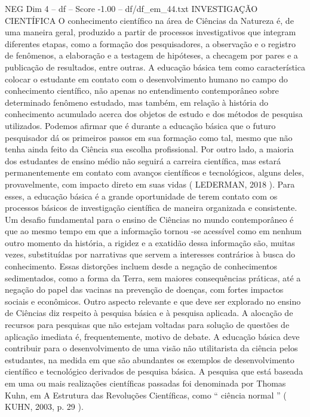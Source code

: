\begin{textsample}{NEG Dim 4 – df – Score -1.00 – df/df\_em\_44.txt}  \label{ex:f4_neg_070}
INVESTIGAÇÃO CIENTÍFICA O conhecimento científico na área de Ciências da Natureza é, de uma maneira geral, produzido a partir de processos investigativos que integram diferentes etapas, como a formação dos pesquisadores, a observação e o registro de fenômenos, a elaboração e a testagem de hipóteses, a checagem por pares e a publicação de resultados, entre outras.
A educação básica tem como característica colocar o estudante em contato com o desenvolvimento humano no campo do conhecimento científico, não apenas no entendimento contemporâneo sobre determinado fenômeno estudado, mas também, em relação à história do conhecimento acumulado acerca dos objetos de estudo e dos métodos de pesquisa utilizados.
Podemos afirmar que é durante a educação básica que o futuro pesquisador dá os primeiros passos em sua formação como tal, mesmo que não tenha ainda feito da Ciência sua escolha profissional.
Por outro lado, a maioria dos estudantes de ensino médio não seguirá a carreira científica, mas estará permanentemente em contato com avanços científicos e tecnológicos, alguns deles, provavelmente, com impacto direto em suas vidas ( LEDERMAN, 2018 ).
Para esses, a educação básica é a grande oportunidade de terem contato com os processos básicos de investigação científica de maneira organizada e consistente.
Um desafio fundamental para o ensino de Ciências no mundo contemporâneo é que ao mesmo tempo em que a informação tornou -se acessível como em nenhum outro momento da história, a rigidez e a exatidão dessa informação são, muitas vezes, substituídas por narrativas que servem a interesses contrários à busca do conhecimento.
Essas distorções incluem desde a negação de conhecimentos sedimentados, como a forma da Terra, sem maiores consequências práticas, até a negação do papel das vacinas na prevenção de doenças, com fortes impactos sociais e econômicos.
Outro aspecto relevante e que deve ser explorado no ensino de Ciências diz respeito à pesquisa básica e à pesquisa aplicada.
A alocação de recursos para pesquisas que não estejam voltadas para solução de questões de aplicação imediata é, frequentemente, motivo de debate.
A educação básica deve contribuir para o desenvolvimento de uma visão não utilitarista da ciência pelos estudantes, na medida em que são abundantes os exemplos de desenvolvimento científico e tecnológico derivados de pesquisa básica.
A pesquisa que está baseada em uma ou mais realizações científicas passadas foi denominada por Thomas Kuhn, em A Estrutura das Revoluções Científicas, como “ ciência normal ” ( KUHN, 2003, p. 29 ).

\end{textsample}
